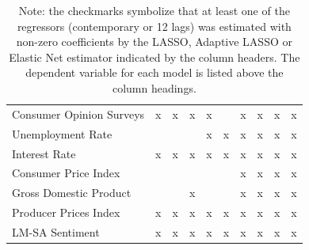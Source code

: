 \begin{landscape}
\begin{table}[]
\begin{adjustbox}{max width=\linewidth}
\begin{tabular}{llllllllll}
Consumer Opinion Surveys & x        & x                 & x             & x        &                  & x            & x       & x                & x            \\
Unemployment Rate        &          &                   &               & x        & x                & x            & x       & x                & x            \\
Interest Rate            & x        & x                 & x             & x        & x                & x            & x       & x                & x            \\
Consumer Price Index     &          &                   &               &          &                  & x            & x       & x                & x            \\
Gross Domestic Product   &          &                   & x             &          &                  & x            & x       & x                & x            \\
Producer Prices Index    & x        & x                 & x             & x        & x                & x            & x       & x                & x            \\ \hline
LM-SA Sentiment          & x        & x                 & x             & x        & x                & x            & x       & x                & x    \\ \hline     
\end{tabular}
\end{adjustbox}
\caption*{Note: the checkmarks symbolize that at least one of the regressors (contemporary or 12 lags) was estimated with non-zero coefficients by the LASSO, Adaptive LASSO or Elastic Net estimator indicated by the column headers. The dependent variable for each model is listed above the column headings.}
\end{table}
\end{landscape}













